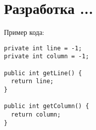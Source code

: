 \chapter{Разработка ...}

Пример кода:

\begin{lstlisting}[style=java]
private int line = -1;
private int column = -1;

public int getLine() {
  return line;
}

public int getColumn() {
  return column;
}
\end{lstlisting}